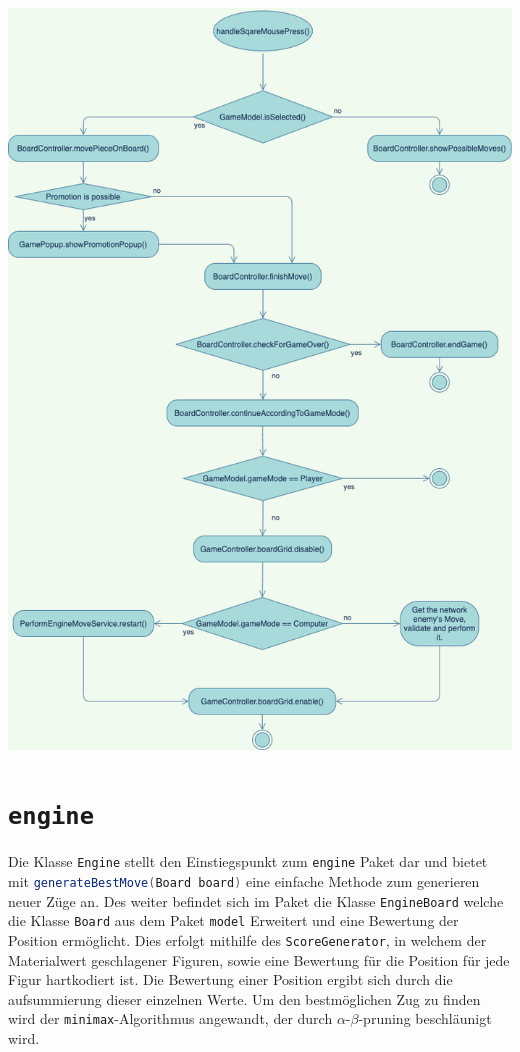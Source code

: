 \documentclass{scrreprt}
\newcommand{\lstinlinejava}[1]{\lstinline[language=java]{#1}}
\newcommand{\lstj}[1]{\lstinlinejava{#1}}
\begin{document}
\includegraphics[width=\linewidth]{ActivityDiagramMove}

\chapter{\lstj{engine}}
Die Klasse \lstj{Engine} stellt den Einstiegspunkt zum \lstj{engine} Paket dar und bietet mit \lstj{generateBestMove(Board board)} eine einfache Methode zum generieren neuer Züge an. Des weiter befindet sich im Paket die Klasse \lstj{EngineBoard} welche die Klasse \lstj{Board} aus dem Paket \lstj{model} Erweitert und eine Bewertung der Position ermöglicht. Dies erfolgt mithilfe des \lstj{ScoreGenerator}, in welchem der Materialwert geschlagener Figuren, sowie eine Bewertung für die Position für jede Figur hartkodiert ist. Die Bewertung einer Position ergibt sich durch die aufsummierung dieser einzelnen Werte. Um den bestmöglichen Zug zu finden wird der \lstj{minimax}-Algorithmus angewandt, der durch $\alpha$-$\beta$-pruning beschläunigt wird.
\end{document}
